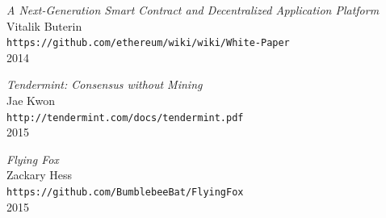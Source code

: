 \documentclass[a4paper]{article}
\begin{document}
\begin{thebibliography}{99}
\emph{A Next-Generation Smart Contract and Decentralized Application Platform}\\
Vitalik Buterin\\
\texttt{https://github.com/ethereum/wiki/wiki/White-Paper}\\
2014

\emph{Tendermint: Consensus without Mining}\\
Jae Kwon\\
\texttt{http://tendermint.com/docs/tendermint.pdf}\\
2015

\emph{Flying Fox}\\
Zackary Hess\\
\texttt{https://github.com/BumblebeeBat/FlyingFox}\\
2015

\end{thebibliography}
\end{document}
